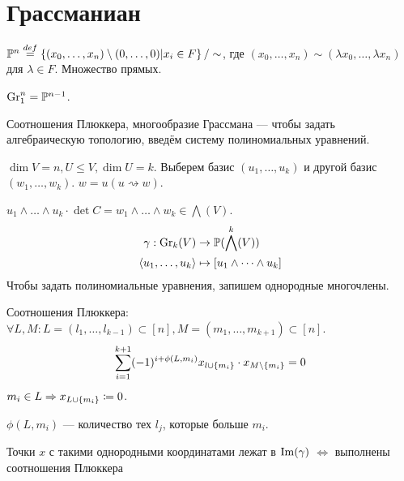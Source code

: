 {{%
%
%
%

    }
}


\section{Грассманиан}

$\mathbb{P}^n \overset{def}{=} \left\{(x_0, \dots, x_n) \setminus (0, \dots, 0)\middle|x_i \in F\right\}/\sim$, где $(x_0, \dots, x_n) \sim (\lambda x_0, \dots, \lambda x_n)$ для $\lambda \in F$.
Множество прямых.

$\operatorname{Gr}_1^n = \mathbb{P}^{n - 1}$.

Соотношения Плюккера, многообразие Грассмана --- чтобы задать алгебраическую топологию, введём систему полиномиальных уравнений.

$\dim V = n, U \le V, \dim U = k$.
Выберем базис $(u_1, \dots, u_k)$ и другой базис $(w_1, \dots, w_k)$. $w = u(u \rightsquigarrow w)$.

$u_1 \wedge \dots \wedge u_k \cdot \det C = w_1 \wedge \dots \wedge w_k \in \bigwedge(V)$.
\begin{align*}
    \gamma: \operatorname{Gr}_k(V)&\rightarrow \mathbb{P}(\bigwedge^k(V))\\\left\langle u_1, \dots, u_k\right\rangle &\mapsto [u_1 \wedge \dots \wedge u_k]
\end{align*}
Чтобы задать полиномиальные уравнения, запишем однородные многочлены.

Соотношения Плюккера: $\forall L, M: L = (l_1, \dots, l_{k - 1}) \subset [n], M = (m_1, \dots, m_{k + 1}) \subset [n]$.
\[\sum\limits_{i = 1}^{k + 1}(-1)^{i + \phi(L, m_i)}x_{l \cup \{m_i\}} \cdot x_{M \setminus \{m_i\}} = 0\]
$m_i \in L \Rightarrow x_{L \cup \{m_i\}} \coloneqq 0$.

$\phi(L, m_i)$ --- количество тех $l_j$, которые больше $m_i$.

Точки $x$ с такими однородными координатами лежат в $\operatorname{Im}(\gamma)$ $\iff$ выполнены соотношения Плюккера